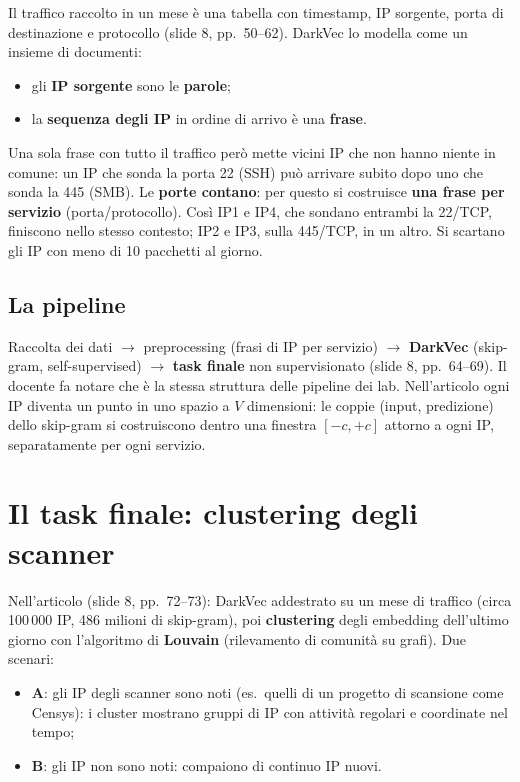 Il traffico raccolto in un mese è una tabella con timestamp, IP sorgente, porta di destinazione e protocollo (slide 8, pp.~50--62).
DarkVec lo modella come un insieme di documenti:
\begin{itemize}
  \item gli \textbf{IP sorgente} sono le \textbf{parole};
  \item la \textbf{sequenza degli IP} in ordine di arrivo è una \textbf{frase}.
\end{itemize}
Una sola frase con tutto il traffico però mette vicini IP che non hanno niente in comune: un IP che sonda la porta 22 (SSH) può
arrivare subito dopo uno che sonda la 445 (SMB). Le \textbf{porte contano}: per questo si costruisce \textbf{una frase per servizio}
(porta/protocollo). Così IP1 e IP4, che sondano entrambi la 22/TCP, finiscono nello stesso contesto; IP2 e IP3, sulla 445/TCP, in un
altro. Si scartano gli IP con meno di 10 pacchetti al giorno.

\subsection{La pipeline}
Raccolta dei dati $\rightarrow$ preprocessing (frasi di IP per servizio) $\rightarrow$ \textbf{DarkVec} (skip-gram, self-supervised)
$\rightarrow$ \textbf{task finale} non supervisionato (slide 8, pp.~64--69). Il docente fa notare che è la stessa struttura delle
pipeline dei lab. Nell'articolo ogni IP diventa un punto in uno spazio a $V$ dimensioni: le coppie (input, predizione) dello
skip-gram si costruiscono dentro una finestra $[-c, +c]$ attorno a ogni IP, separatamente per ogni servizio.

\section{Il task finale: clustering degli scanner}
Nell'articolo (slide 8, pp.~72--73): DarkVec addestrato su un mese di traffico (circa 100\,000 IP, 486 milioni di skip-gram), poi
\textbf{clustering} degli embedding dell'ultimo giorno con l'algoritmo di \textbf{Louvain} (rilevamento di comunità su grafi). Due
scenari:
\begin{itemize}
  \item \textbf{A}: gli IP degli scanner sono noti (es.\ quelli di un progetto di scansione come Censys): i cluster mostrano gruppi di
        IP con attività regolari e coordinate nel tempo;
  \item \textbf{B}: gli IP non sono noti: compaiono di continuo IP nuovi.
\end{itemize}

